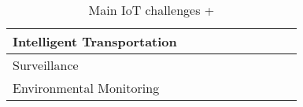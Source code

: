 \begin{table}[h!]
\begin{tabulary}{\textwidth}{L|C|C|C|C|C|C|C|C|C}
	Intelligent Transportation &            &          &               &             &     &      &                 &        & \\\hline
	Surveillance               &            &          &               &             &     &      &                 &        & \\\hline
	Environmental Monitoring   &            &          &               &             &     &      &                 &        & \\     
	\end{tabulary}
\caption{\label{tab:iot_challenges} Main IoT challenges\cite{kouicem_internet_2018} + \cite{venkatesan_design_2017} \cite{hancke_role_2012} \cite{alba_intelligent_2016}}
\end{table}
\twocolumn



